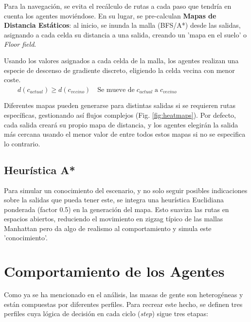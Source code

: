 \documentclass[11pt,spanish,listoffigures,listoftables]{tfgetsinf}
\begin{document}
Para la navegación, se evita el recálculo de rutas a cada paso que tendría en cuenta los agentes moviéndose. En su lugar, se pre-calculan \textbf{Mapas de Distancia Estáticos}: al inicio, se inunda la malla (BFS/A*) desde las salidas, asignando a cada celda su distancia a una salida, creando un 'mapa en el suelo' o \textit{Floor field}. 

Usando los valores asignados a cada celda de la malla, los agentes realizan una especie de descenso de gradiente discreto, eligiendo la celda vecina con menor coste. \\ $\quad \quad d(c_{actual}) \ge d(c_{vecino}) \quad \text{Se mueve de} \; c_{actual} \;\text{a}\; c_{vecino} $

Diferentes mapas pueden generarse para distintas salidas si se requieren rutas específicas, gestionando así flujos complejos (Fig. \ref{fig:heatmaps}). Por defecto, cada salida creará su propio mapa de distancia, y los agentes elegirán la salida más cercana usando el menor valor de entre todos estos mapas si no se especifica lo contrario.

\subsection{Heurística A*}
Para simular un conocimiento del escenario, y no solo seguir posibles indicaciones sobre la salidas que pueda tener este, se integra una heurística Euclidiana ponderada (factor 0.5) en la generación del mapa. Esto suaviza las rutas en espacios abiertos, reduciendo el movimiento en zigzag típico de las mallas Manhattan pero da algo de realismo al comportamiento y simula este 'conocimiento'.

\section{Comportamiento de los Agentes}
Como ya se ha mencionado en el análisis, las masas de gente son heterogéneas y están compuestas por diferentes perfiles. Para recrear este hecho, se definen tres perfiles cuya lógica de decisión en cada ciclo (\textit{step}) sigue tres etapas:
\end{document}
